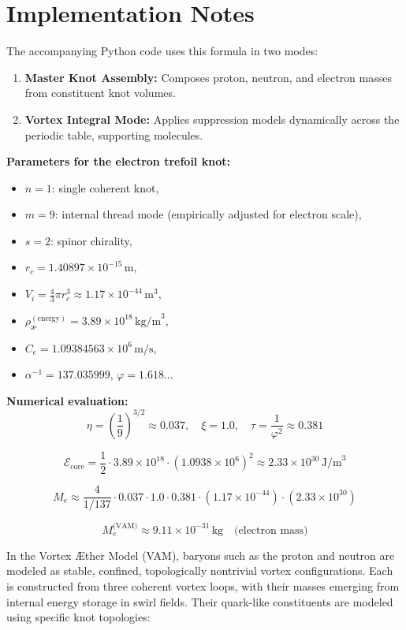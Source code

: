 \documentclass[12pt]{article}
\begin{document}
\section{Implementation Notes}
The accompanying Python code uses this formula in two modes:
\begin{enumerate}
    \item \textbf{Master Knot Assembly:} Composes proton, neutron, and electron masses from constituent knot volumes.
    \item \textbf{Vortex Integral Mode:} Applies suppression models dynamically across the periodic table, supporting molecules.
\end{enumerate}


\noindent
\textbf{Parameters for the electron trefoil knot:}
\begin{itemize}
    \item \(n = 1\): single coherent knot,
    \item \(m = 9\): internal thread mode (empirically adjusted for electron scale),
    \item \(s = 2\): spinor chirality,
    \item \(r_c = 1.40897 \times 10^{-15} \, \text{m}\),
    \item \(V_i = \frac{4}{3} \pi r_c^3 \approx 1.17 \times 10^{-44} \, \text{m}^3\),
    \item \(\rho_\text{\ae}^{(\text{energy})} = 3.89 \times 10^{18} \, \text{kg/m}^3\),
    \item \(C_e = 1.09384563 \times 10^6 \, \text{m/s}\),
    \item \(\alpha^{-1} = 137.035999\), \quad \(\varphi = 1.618...\)
\end{itemize}

\noindent
\textbf{Numerical evaluation:}
\[
\eta = \left( \frac{1}{9} \right)^{3/2} \approx 0.037,
\quad
\xi = 1.0,
\quad
\tau = \frac{1}{\varphi^2} \approx 0.381
\]

\[
\mathcal{E}_\text{core} = \frac{1}{2} \cdot 3.89 \times 10^{18} \cdot (1.0938 \times 10^6)^2 \approx 2.33 \times 10^{30} \, \text{J/m}^3
\]

\[
M_e \approx \frac{4}{1/137} \cdot 0.037 \cdot 1.0 \cdot 0.381 \cdot (1.17 \times 10^{-44}) \cdot (2.33 \times 10^{30})
\]

\[
\boxed{
M_e^\text{(VAM)} \approx 9.11 \times 10^{-31} \, \text{kg}
}
\quad \text{(electron mass)}
\]

  In the Vortex \AE ther Model (VAM), baryons such as the proton and neutron are modeled as stable, confined, topologically nontrivial vortex configurations. Each is constructed from three coherent vortex loops, with their masses emerging from internal energy storage in swirl fields. Their quark-like constituents are modeled using specific knot topologies:
\end{document}
